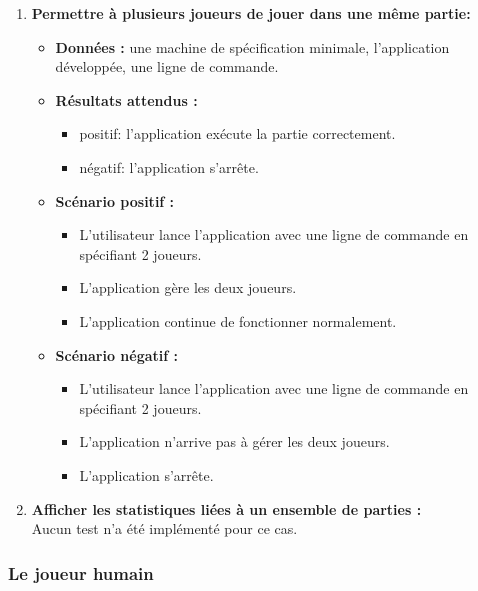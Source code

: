 \begin{enumerate}
    \item \textbf{Permettre à plusieurs joueurs de jouer dans une même partie:}
    \begin{itemize}
        \item \textbf{Données :} une machine de spécification minimale, l'application développée, une ligne de commande.
        \item \textbf{Résultats attendus :} 
        \begin{itemize}
            \item positif: l'application exécute la partie correctement.
            \item négatif: l'application s'arrête.
        \end{itemize}
        \item \textbf{Scénario positif :}
        \begin{itemize}
            \item L'utilisateur lance l'application avec une ligne de commande en spécifiant 2 joueurs.
            \item L'application gère les deux joueurs.
            \item L'application continue de fonctionner normalement.
        \end{itemize}
        \item \textbf{Scénario négatif :}
        \begin{itemize}
            \item L'utilisateur lance l'application avec une ligne de commande en spécifiant 2 joueurs.
            \item L'application n'arrive pas à gérer les deux joueurs.
            \item L'application s'arrête.
        \end{itemize}
    \end{itemize}
    
    \item \textbf{Afficher les statistiques liées à un ensemble de parties :}\\
    Aucun test n'a été implémenté pour ce cas.
    
\end{enumerate}

\subsubsection{Le joueur humain}

